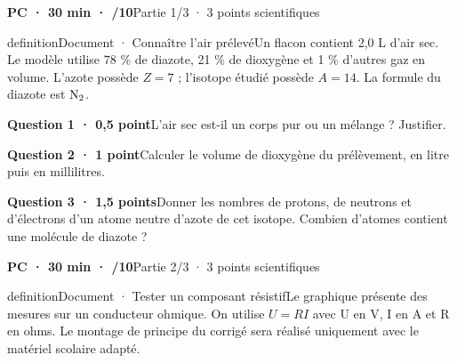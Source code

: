 \vfill{}
\label{ann-13}
\textbf{PC · 30 min · /10}\hfill Partie 1/3 · 3 points scientifiques
\begin{pcEncadre}{definition}{Document · Connaître l’air prélevé}Un flacon contient 2,0 L d’air sec. Le modèle utilise 78 \% de diazote, 21 \% de dioxygène et 1 \% d’autres gaz en volume. L’azote possède $Z=7$ ; l’isotope étudié possède $A=14$. La formule du diazote est $\ce{N2}$.\end{pcEncadre}
\par\addvspace{3mm}\noindent\begin{minipage}{\linewidth}\textbf{Question 1 · 0,5 point}\quad L’air sec est-il un corps pur ou un mélange ? Justifier.\par\end{minipage}\par
\par\addvspace{3mm}\noindent\begin{minipage}{\linewidth}\textbf{Question 2 · 1 point}\quad Calculer le volume de dioxygène du prélèvement, en litre puis en millilitres.\par\end{minipage}\par
\par\addvspace{3mm}\noindent\begin{minipage}{\linewidth}\textbf{Question 3 · 1,5 points}\quad Donner les nombres de protons, de neutrons et d’électrons d’un atome neutre d’azote de cet isotope. Combien d’atomes contient une molécule de diazote ?\par\end{minipage}\par
\vfill{}
\textbf{PC · 30 min · /10}\hfill Partie 2/3 · 3 points scientifiques
\begin{pcEncadre}{definition}{Document · Tester un composant résistif}Le graphique présente des mesures sur un conducteur ohmique. On utilise $U=RI$ avec U en V, I en A et R en ohms. Le montage de principe du corrigé sera réalisé uniquement avec le matériel scolaire adapté.\end{pcEncadre}
